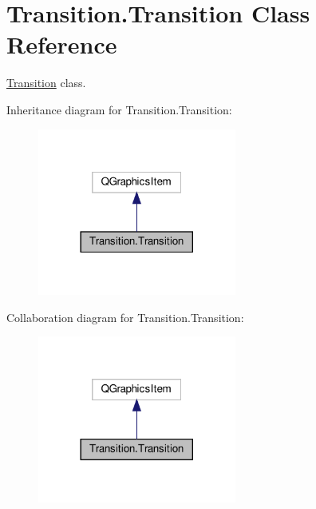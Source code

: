 \hypertarget{classTransition_1_1Transition}{}\section{Transition.\+Transition Class Reference}
\label{classTransition_1_1Transition}


\mbox{\hyperlink{classTransition_1_1Transition}{Transition}} class.  




Inheritance diagram for Transition.\+Transition\+:\nopagebreak
\begin{figure}[H]
\begin{center}
\leavevmode
\includegraphics[width=185pt]{classTransition_1_1Transition__inherit__graph}
\end{center}
\end{figure}


Collaboration diagram for Transition.\+Transition\+:\nopagebreak
\begin{figure}[H]
\begin{center}
\leavevmode
\includegraphics[width=185pt]{classTransition_1_1Transition__coll__graph}
\end{center}
\end{figure}
